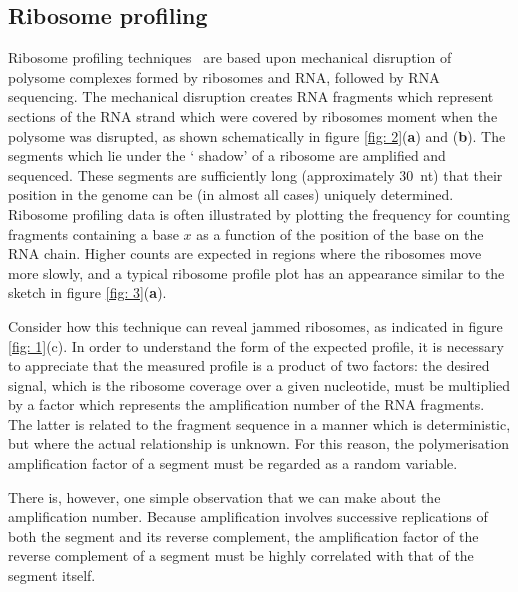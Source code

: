 \documentclass[12pt]{iopart}
\begin{document}
 \subsection{Ribosome profiling}
 \label{sec: 3.1}
 
Ribosome profiling techniques~\cite{Ingolia2009,Ingolia2012} are based upon
mechanical disruption of polysome complexes formed by ribosomes and RNA,
followed by RNA sequencing. The mechanical disruption creates RNA fragments
which represent sections of the RNA strand which were covered by ribosomes
moment when the polysome was disrupted, as shown schematically in figure
\ref{fig: 2}({\bf a}) and ({\bf b}). The segments which lie under the \lq
shadow' of a ribosome are amplified and sequenced. These segments are
sufficiently long (approximately 30~nt) that their position in the genome can
be (in almost all cases) uniquely determined.  Ribosome profiling data is often
illustrated by plotting the frequency for counting fragments containing a base
$x$ as a function of the position of the base on the RNA chain.  Higher counts
are expected in regions where the ribosomes move more slowly, and a typical
ribosome profile plot has an appearance similar to the sketch in figure
\ref{fig: 3}({\bf a}). 

Consider how this technique can reveal jammed ribosomes, as indicated in figure \ref{fig: 1}(c). 
In order to understand the form of the expected profile, it is necessary to appreciate that the 
measured profile is a product of two factors: the desired signal, which is the ribosome coverage 
over a given nucleotide, must be multiplied by a factor which represents the amplification 
number of the RNA fragments. The latter is related to the fragment sequence in a manner
which is deterministic, but where the actual relationship is unknown. For this reason, the 
polymerisation amplification factor of a segment must be regarded as a random variable.

There is, however, one simple observation that we can make about the amplification number.
Because amplification involves successive replications of both the segment and its reverse 
complement, the amplification factor of the reverse complement of a segment must be 
highly correlated with that of the segment itself.
 
\end{document}
